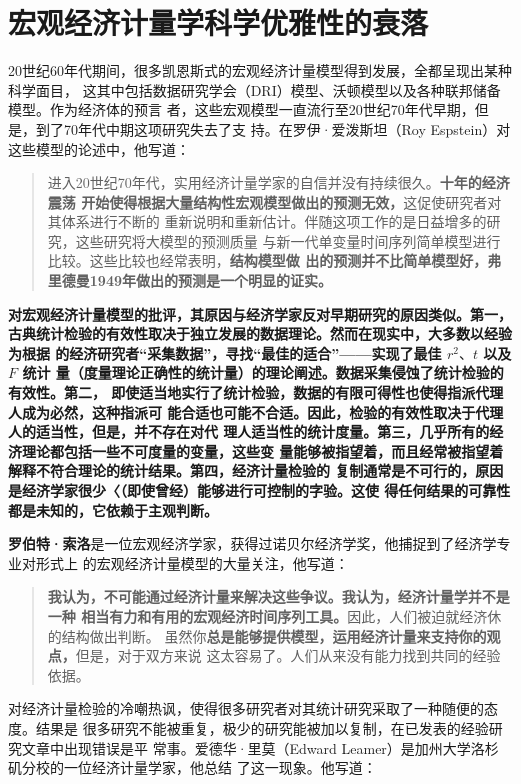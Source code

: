 \section{宏观经济计量学科学优雅性的衰落}

20世纪60年代期间，很多凯恩斯式的宏观经济计量模型得到发展，全都呈现出某种科学面目，
这其中包括数据研究学会（DRI）模型、沃顿模型以及各种联邦储备模型。作为经济体的预言
者，这些宏观模型一直流行至20世纪70年代早期，但是，到了70年代中期这项研究失去了支
持。在罗伊·爱泼斯坦（Roy Espstein）对这些模型的论述中，他写道：

\begin{quotation}
  进入20世纪70年代，实用经济计量学家的自信并没有持续很久。\textbf{十年的经济震荡
    开始使得根据大量结构性宏观模型做出的预测无效，}这促使研究者对其体系进行不断的
  重新说明和重新估计。伴随这项工作的是日益增多的研究，这些研究将大模型的预测质量
  与新一代单变量时间序列简单模型进行比较。这些比较也经常表明，\textbf{结构模型做
    出的预测并不比简单模型好，弗里德曼1949年做出的预测是一个明显的证实。}
\end{quotation}

\textbf{对宏观经济计量模型的批评，其原因与经济学家反对早期研究的原因类似。第一，
  古典统计检验的有效性取决于独立发展的数据理论。然而在现实中，大多数以经验为根据
  的经济研究者“采集数据”，寻找“最佳的适合”——实现了最佳 $r^2、t$ 以及 $F$ 统计
  量（度量理论正确性的统计量）的理论阐述。数据采集侵蚀了统计检验的有效性。第二，
  即使适当地实行了统计检验，数据的有限可得性也使得指派代理人成为必然，这种指派可
  能合适也可能不合适。因此，检验的有效性取决于代理人的适当性，但是，并不存在对代
  理人适当性的统计度量。第三，几乎所有的经济理论都包括一些不可度量的变量，这些变
  量能够被指望着，而且经常被指望着解释不符合理论的统计结果。第四，经济计量检验的
  复制通常是不可行的，原因是经济学家很少〈（即使曾经）能够进行可控制的字验。这使
  得任何结果的可靠性都是未知的，它依赖于主观判断。}

\textbf{罗伯特·索洛}是一位宏观经济学家，获得过诺贝尔经济学奖，他捕捉到了经济学专业对形式上
的宏观经济计量模型的大量关注，他写道：

\begin{quotation}
  \textbf{我认为，不可能通过经济计量来解决这些争议。我认为，经济计量学并不是一种
    相当有力和有用的宏观经济时间序列工具。}因此，人们被迫就经济休的结构做出判断。
  虽然你\textbf{总是能够提供模型，运用经济计量来支持你的观点，}但是，对于双方来说
  这太容易了。人们从来没有能力找到共同的经验依据。
\end{quotation}

对经济计量检验的冷嘲热讽，使得很多研究者对其统计研究采取了一种随便的态度。结果是
很多研究不能被重复，极少的研究能被加以复制，在已发表的经验研究文章中出现错误是平
常事。爱德华·里莫（Edward Leamer）是加州大学洛杉矶分校的一位经济计量学家，他总结
了这一现象。他写道：


